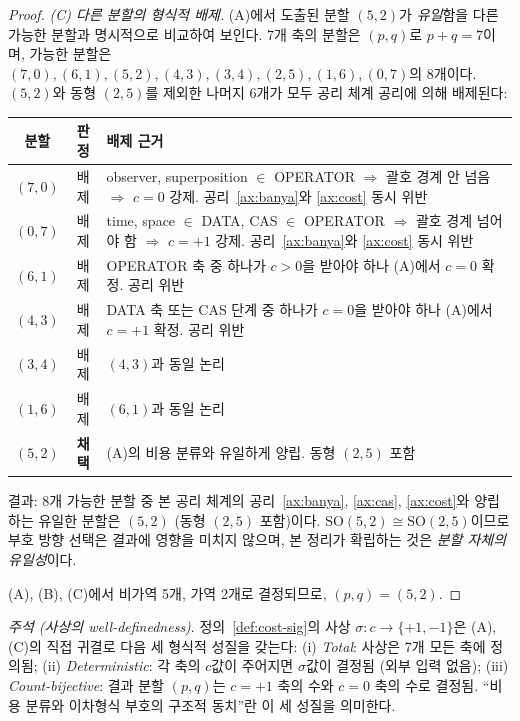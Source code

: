 \documentclass[entropy,article,submit,pdftex,oneauthor]{Definitions/mdpi}
\begin{document}
\begin{proof}
\emph{(C) 다른 분할의 형식적 배제.} (A)에서 도출된 분할 $(5,2)$가 \emph{유일}함을 다른 가능한 분할과 명시적으로 비교하여 보인다. 7개 축의 분할은 $(p, q)$로 $p + q = 7$이며, 가능한 분할은 $(7,0), (6,1), (5,2), (4,3), (3,4), (2,5), (1,6), (0,7)$의 8개이다. $(5,2)$와 동형 $(2,5)$를 제외한 나머지 6개가 모두 공리 체계 공리에 의해 배제된다:
\begin{center}
\small
\begin{tabular}{ccp{8.5cm}}
\toprule
\textbf{분할} & \textbf{판정} & \textbf{배제 근거} \\
\midrule
$(7,0)$ & 배제 & observer, superposition $\in$ OPERATOR $\Rightarrow$ 괄호 경계 안 넘음 $\Rightarrow$ $c=0$ 강제. 공리~\ref{ax:banya}와 \ref{ax:cost} 동시 위반 \\
$(0,7)$ & 배제 & time, space $\in$ DATA, CAS $\in$ OPERATOR $\Rightarrow$ 괄호 경계 넘어야 함 $\Rightarrow$ $c=+1$ 강제. 공리~\ref{ax:banya}와 \ref{ax:cost} 동시 위반 \\
$(6,1)$ & 배제 & OPERATOR 축 중 하나가 $c>0$을 받아야 하나 (A)에서 $c=0$ 확정. 공리 위반 \\
$(4,3)$ & 배제 & DATA 축 또는 CAS 단계 중 하나가 $c=0$을 받아야 하나 (A)에서 $c=+1$ 확정. 공리 위반 \\
$(3,4)$ & 배제 & $(4,3)$과 동일 논리 \\
$(1,6)$ & 배제 & $(6,1)$과 동일 논리 \\
$(5,2)$ & \textbf{채택} & (A)의 비용 분류와 유일하게 양립. 동형 $(2,5)$ 포함 \\
\bottomrule
\end{tabular}
\end{center}
결과: 8개 가능한 분할 중 본 공리 체계의 공리~\ref{ax:banya}, \ref{ax:cas}, \ref{ax:cost}와 양립하는 유일한 분할은 $(5,2)$ (동형 $(2,5)$ 포함)이다. $\mathrm{SO}(5,2) \cong \mathrm{SO}(2,5)$이므로 부호 방향 선택은 결과에 영향을 미치지 않으며, 본 정리가 확립하는 것은 \emph{분할 자체의 유일성}이다.

(A), (B), (C)에서 비가역 5개, 가역 2개로 결정되므로, $(p, q) = (5, 2)$.
\end{proof}

\emph{주석 (사상의 well-definedness)}. 정의~\ref{def:cost-sig}의 사상 $\sigma: c \to \{+1, -1\}$은 (A), (C)의 직접 귀결로 다음 세 형식적 성질을 갖는다: (i) \emph{Total}: 사상은 7개 모든 축에 정의됨; (ii) \emph{Deterministic}: 각 축의 $c$값이 주어지면 $\sigma$값이 결정됨 (외부 입력 없음); (iii) \emph{Count-bijective}: 결과 분할 $(p,q)$는 $c=+1$ 축의 수와 $c=0$ 축의 수로 결정됨. ``비용 분류와 이차형식 부호의 구조적 동치''란 이 세 성질을 의미한다.
\end{document}
